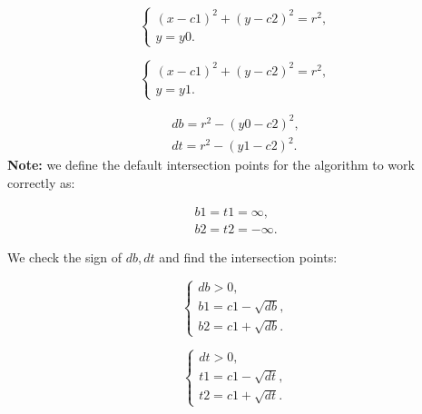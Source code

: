 \documentclass{report}
\begin{document}
\begin{itemize}
			\begin{equation}
				\begin{cases}
					(x - c1)^2 + (y - c2)^2 = r^2,\\ 
					y = y0.			
				\end{cases}
				\label{eq:sys3}
			\end{equation}
			
			\begin{equation}
				\begin{cases}
					(x - c1)^2 + (y - c2)^2 = r^2,\\ 
					y = y1.				
				\end{cases}
				\label{eq:sys4}
			\end{equation}
			
			\begin{equation}
				\begin{gathered}
					db = r^2 - (y0 - c2)^2,\\
					dt = r^2 - (y1 - c2)^2.
					\label{eq:diskriminant2}
				\end{gathered}
			\end{equation}
			{\bfseries Note:} we define the default intersection points for the algorithm to work correctly as:
			
			\begin{equation}
				\begin{gathered}
					b1 = t1 =  \infty,\\
					b2 = t2 = -\infty.
					\label{eq:btinf}
				\end{gathered}
		    \end{equation}
		
		    We check the sign of $db, dt$ and find the intersection points:
			
		   \begin{equation}
		 		\begin{cases}
					db > 0,\\ 
					b1 = c1 - \sqrt {db},\\
					b2 = c1 + \sqrt {db}.
				\label{eq:b1b2}
				\end{cases}
		   \end{equation}
		
		   \begin{equation}
				\begin{cases}
					dt > 0,\\ 
					t1 = c1 - \sqrt {dt},\\
					t2 = c1 + \sqrt {dt}.
					\label{eq:t1t2}
				\end{cases}
			\end{equation}
			

\end{itemize}
\end{document}
